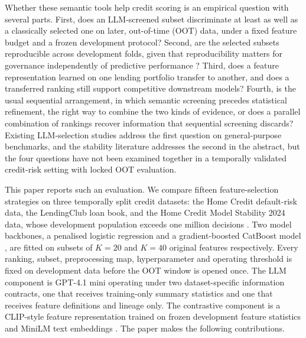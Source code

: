 \documentclass[preprint,12pt]{elsarticle}
\newcommand{\Kfeat}{K}
\begin{document}
Whether these semantic tools help credit scoring is an empirical question with several parts. First, does an LLM-screened subset discriminate at least as well as a classically selected one on later, out-of-time (OOT) data, under a fixed feature budget and a frozen development protocol? Second, are the selected subsets reproducible across development folds, given that reproducibility matters for governance independently of predictive performance \cite{kalousis2007,nogueira2018}? Third, does a feature representation learned on one lending portfolio transfer to another, and does a transferred ranking still support competitive downstream models? Fourth, is the usual sequential arrangement, in which semantic screening precedes statistical refinement, the right way to combine the two kinds of evidence, or does a parallel combination of rankings recover information that sequential screening discards? Existing LLM-selection studies address the first question on general-purpose benchmarks, and the stability literature addresses the second in the abstract, but the four questions have not been examined together in a temporally validated credit-risk setting with locked OOT evaluation.

This paper reports such an evaluation. We compare fifteen feature-selection strategies on three temporally split credit datasets: the Home Credit default-risk data, the LendingClub loan book, and the Home Credit Model Stability 2024 data, whose development population exceeds one million decisions \cite{homecredit2018,lendingclub_kaggle,homecredit2024}. Two model backbones, a penalised logistic regression and a gradient-boosted CatBoost model \cite{prokhorenkova2018}, are fitted on subsets of $\Kfeat=20$ and $\Kfeat=40$ original features respectively. Every ranking, subset, preprocessing map, hyperparameter and operating threshold is fixed on development data before the OOT window is opened once. The LLM component is GPT-4.1 mini \cite{openai2025gpt41} operating under two dataset-specific information contracts, one that receives training-only summary statistics and one that receives feature definitions and lineage only. The contrastive component is a CLIP-style feature representation trained on frozen development feature statistics and MiniLM text embeddings \cite{wang2020minilm,reimers2019}. The paper makes the following contributions.
\end{document}
